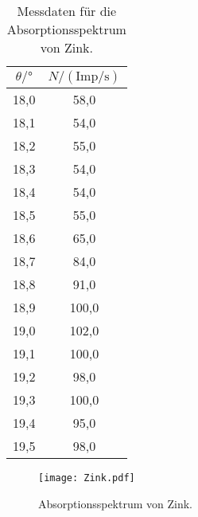 \begin{table}[H]
    \centering
    \caption{Messdaten für die Absorptionsspektrum von Zink.}
    \label{tab:Zink}
    \begin{tabular}{|c| c|}
    \toprule
    $\theta/\mathrm{°}$ & $N/(\mathrm{Imp/s})$ \\
    \midrule
    18,0 &	58,0 \\
    18,1 &	54,0 \\
    18,2 &	55,0 \\
    18,3 &	54,0 \\
    18,4 &	54,0 \\
    18,5 &	55,0 \\
    18,6 &	65,0 \\
    18,7 &	84,0 \\
    18,8 &	91,0 \\
    18,9 &	100,0 \\
    19,0 & 	102,0 \\
    19,1 &	100,0 \\
    19,2 &	98,0 \\
    19,3 &	100,0 \\
    19,4 &	95,0 \\
    19,5 &	98,0 \\
    \bottomrule
    \end{tabular}
\end{table}
\begin{figure}[H]
    \centering
    \texttt{[image: Zink.pdf]}
    \caption{Absorptionsspektrum von Zink.}
    \label{fig:Zink}
  \end{figure}

